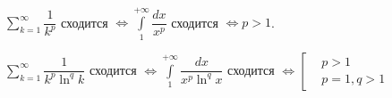 \documentclass[../main.tex]{subfiles}
\begin{document}
\begin{example}
    
    ~

    \( \sum\limits_{ k=1}^{ \infty } \dfrac{ 1}{ k^p} \) сходится \( \Longleftrightarrow \displaystyle\int\limits_{ 1}^{ + \infty } \dfrac{ dx}{ x^p} \) сходится \( \Longleftrightarrow p > 1\).

    \( \sum\limits_{ k=1}^{ \infty } \dfrac{ 1}{ k^p \ln ^qk} \) сходится \( \Longleftrightarrow \displaystyle\int\limits_{ 1}^{ + \infty } \dfrac{ dx}{ x^p \ln ^qx} \) сходится \( \Longleftrightarrow \left[ \begin{aligned}
        & p > 1\\ 
        & p=1, q > 1
    \end{aligned}\right.\)
\end{example}
\end{document}

